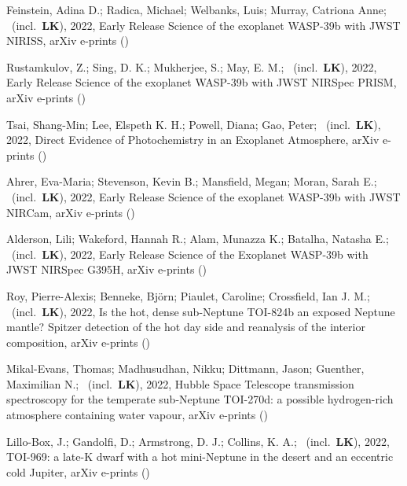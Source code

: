 \item[{\color{numcolor}\scriptsize26}] Feinstein, Adina D.; Radica, Michael; Welbanks, Luis; Murray, Catriona Anne; \etal\ (incl.\ \textbf{LK}), 2022, Early Release Science of the exoplanet WASP-39b with JWST NIRISS, arXiv e-prints ()

\item[{\color{numcolor}\scriptsize25}] Rustamkulov, Z.; Sing, D. K.; Mukherjee, S.; May, E. M.; \etal\ (incl.\ \textbf{LK}), 2022, Early Release Science of the exoplanet WASP-39b with JWST NIRSpec PRISM, arXiv e-prints ()

\item[{\color{numcolor}\scriptsize24}] Tsai, Shang-Min; Lee, Elspeth K. H.; Powell, Diana; Gao, Peter; \etal\ (incl.\ \textbf{LK}), 2022, Direct Evidence of Photochemistry in an Exoplanet Atmosphere, arXiv e-prints ()

\item[{\color{numcolor}\scriptsize23}] Ahrer, Eva-Maria; Stevenson, Kevin B.; Mansfield, Megan; Moran, Sarah E.; \etal\ (incl.\ \textbf{LK}), 2022, Early Release Science of the exoplanet WASP-39b with JWST NIRCam, arXiv e-prints ()

\item[{\color{numcolor}\scriptsize22}] Alderson, Lili; Wakeford, Hannah R.; Alam, Munazza K.; Batalha, Natasha E.; \etal\ (incl.\ \textbf{LK}), 2022, Early Release Science of the Exoplanet WASP-39b with JWST NIRSpec G395H, arXiv e-prints ()

\item[{\color{numcolor}\scriptsize21}] Roy, Pierre-Alexis; Benneke, Bj{\"o}rn; Piaulet, Caroline; Crossfield, Ian J. M.; \etal\ (incl.\ \textbf{LK}), 2022, Is the hot, dense sub-Neptune TOI-824b an exposed Neptune mantle? Spitzer detection of the hot day side and reanalysis of the interior composition, arXiv e-prints ()

\item[{\color{numcolor}\scriptsize20}] Mikal-Evans, Thomas; Madhusudhan, Nikku; Dittmann, Jason; Guenther, Maximilian N.; \etal\ (incl.\ \textbf{LK}), 2022, Hubble Space Telescope transmission spectroscopy for the temperate sub-Neptune TOI-270d: a possible hydrogen-rich atmosphere containing water vapour, arXiv e-prints ()

\item[{\color{numcolor}\scriptsize19}] Lillo-Box, J.; Gandolfi, D.; Armstrong, D. J.; Collins, K. A.; \etal\ (incl.\ \textbf{LK}), 2022, TOI-969: a late-K dwarf with a hot mini-Neptune in the desert and an eccentric cold Jupiter, arXiv e-prints ()

